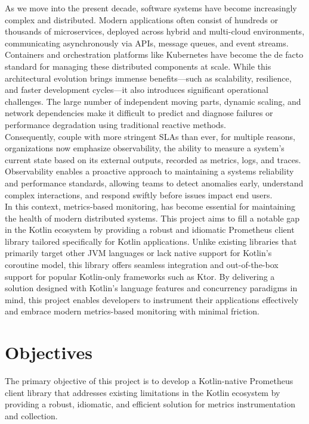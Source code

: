 As we move into the present decade, software systems have become increasingly complex and distributed.
Modern applications often consist of hundreds or thousands of microservices, deployed across hybrid and multi-cloud environments, communicating asynchronously via APIs, message queues, and event streams.
Containers and orchestration platforms like Kubernetes have become the de facto standard for managing these
distributed components at scale\cite{devtron_kubernetes}.
While this architectural evolution brings immense benefits—such as scalability, resilience, and faster development cycles—it also introduces significant operational challenges.
The large number of independent moving parts, dynamic scaling, and network dependencies make it difficult to predict
and diagnose failures or performance degradation using traditional reactive methods.\\

Consequently, couple with more stringent \ac{SLA}s than ever, for multiple reasons, organizations now emphasize
observability, the
ability to
measure a
system's
current
state based
on its
external outputs, recorded as metrics, logs, and traces\cite{dynatrace_observability}.
Observability enables a proactive approach to maintaining a systems reliability and performance standards, allowing
teams to detect
anomalies
early,
understand complex interactions, and respond swiftly before issues impact end users.\\


In this context, metrics-based monitoring, has become essential for maintaining the health of modern distributed systems.
This project aims to fill a notable gap in the Kotlin ecosystem by providing a robust and idiomatic Prometheus client library tailored specifically for Kotlin applications.
Unlike existing libraries that primarily target other JVM languages or lack native support for Kotlin’s coroutine model, this library offers seamless integration and out-of-the-box support for popular Kotlin-only frameworks such as Ktor.
By delivering a solution designed with Kotlin’s language features and concurrency paradigms in mind, this project enables developers to instrument their applications effectively and embrace modern metrics-based monitoring with minimal friction.

\section{Objectives}\label{sec:objectives}

The primary objective of this project is to develop a Kotlin-native Prometheus client library that addresses existing limitations in the Kotlin ecosystem by providing a robust, idiomatic, and efficient solution for metrics instrumentation and collection.

